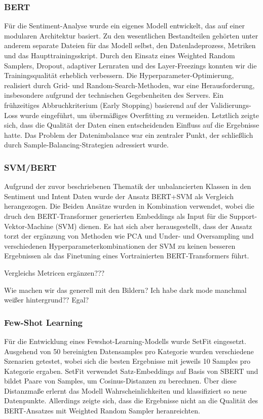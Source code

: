 \subsubsection{BERT}

Für die Sentiment-Analyse wurde ein eigenes Modell entwickelt, das auf einer modularen
Architektur basiert. Zu den wesentlichen Bestandteilen gehörten unter anderem separate
Dateien für das Modell selbst, den Datenladeprozess, Metriken und das Haupttrainingsskript.
Durch den Einsatz eines Weighted Random Samplers, Dropout, adaptiver Lernraten und des
Layer-Freezings konnten wir die Trainingsqualität erheblich verbessern. Die
Hyperparameter-Optimierung, realisiert durch Grid- und Random-Search-Methoden, war eine
Herausforderung, insbesondere aufgrund der technischen Gegebenheiten des Servers. Ein
frühzeitiges Abbruchkriterium (Early Stopping) basierend auf der Validierungs-Loss wurde
eingeführt, um übermäßiges Overfitting zu vermeiden. Letztlich zeigte sich, dass die Qualität
der Daten einen entscheidenden Einfluss auf die Ergebnisse hatte. Das Problem der Datenimbalance
war ein zentraler Punkt, der schließlich durch Sample-Balancing-Strategien adressiert wurde. 


\subsubsection{SVM/BERT}

Aufgrund der zuvor beschriebenen Thematik der unbalancierten Klassen in den Sentiment und
Intent Daten wurde der Ansatz BERT+SVM als Vergleich herangezogen. Die Beiden Ansätze wurden
in Kombination verwendet, wobei die druch den BERT-Transformer generierten Embeddings als Input
für die Support-Vektor-Machine (SVM) dienen. Es hat sich aber herausgestellt, dass der Ansatz
torzt der ergänzung von Methoden wie PCA und Under- und Oversampling und verschiedenen
Hyperparameterkombinationen der SVM zu keinen besseren Ergebnissen als das Finetuning eines
Vortrainierten BERT-Transformers führt.  

Vergleichs Metricen ergänzen??? 

Wie machen wir das generell mit den Bildern? Ich habe dark mode manchmal weißer hintergrund??
Egal? 


\subsubsection{Few-Shot Learning}

Für die Entwicklung eines Fewshot-Learning-Modells wurde SetFit eingesetzt. Ausgehend von
50 bereinigten Datensamples pro Kategorie wurden verschiedene Szenarien getestet, wobei sich
die besten Ergebnisse mit jeweils 10 Samples pro Kategorie ergaben. SetFit verwendet
Satz-Embeddings auf Basis von SBERT und bildet Paare von Samples, um Cosinus-Distanzen zu
berechnen. Über diese Distanzmaße erlernt das Modell Wahrscheinlichkeiten und klassifiziert so
neue Datenpunkte. Allerdings zeigte sich, dass die Ergebnisse nicht an die Qualität des
BERT-Ansatzes mit Weighted Random Sampler heranreichten.

